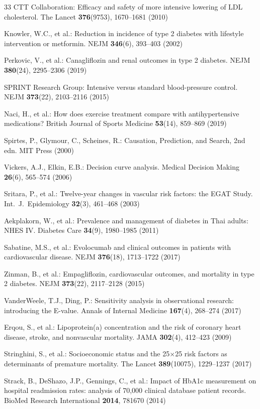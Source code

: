 \documentclass[runningheads]{llncs}
\begin{document}
\begin{thebibliography}{33}
CTT Collaboration:
Efficacy and safety of more intensive lowering of LDL cholesterol.
The Lancet \textbf{376}(9753), 1670--1681 (2010)

Knowler, W.C., et al.:
Reduction in incidence of type 2 diabetes with lifestyle intervention or metformin.
NEJM \textbf{346}(6), 393--403 (2002)

Perkovic, V., et al.:
Canagliflozin and renal outcomes in type 2 diabetes.
NEJM \textbf{380}(24), 2295--2306 (2019)

SPRINT Research Group:
Intensive versus standard blood-pressure control.
NEJM \textbf{373}(22), 2103--2116 (2015)

Naci, H., et al.:
How does exercise treatment compare with antihypertensive medications?
British Journal of Sports Medicine \textbf{53}(14), 859--869 (2019)

Spirtes, P., Glymour, C., Scheines, R.:
Causation, Prediction, and Search, 2nd edn.
MIT Press (2000)

Vickers, A.J., Elkin, E.B.:
Decision curve analysis.
Medical Decision Making \textbf{26}(6), 565--574 (2006)

Sritara, P., et al.:
Twelve-year changes in vascular risk factors: the EGAT Study.
Int.\ J.\ Epidemiology \textbf{32}(3), 461--468 (2003)

Aekplakorn, W., et al.:
Prevalence and management of diabetes in Thai adults: NHES IV.
Diabetes Care \textbf{34}(9), 1980--1985 (2011)

Sabatine, M.S., et al.:
Evolocumab and clinical outcomes in patients with cardiovascular disease.
NEJM \textbf{376}(18), 1713--1722 (2017)

Zinman, B., et al.:
Empagliflozin, cardiovascular outcomes, and mortality in type 2 diabetes.
NEJM \textbf{373}(22), 2117--2128 (2015)

VanderWeele, T.J., Ding, P.:
Sensitivity analysis in observational research: introducing the E-value.
Annals of Internal Medicine \textbf{167}(4), 268--274 (2017)

Erqou, S., et al.:
Lipoprotein(a) concentration and the risk of coronary heart disease,
stroke, and nonvascular mortality.
JAMA \textbf{302}(4), 412--423 (2009)

Stringhini, S., et al.:
Socioeconomic status and the 25$\times$25 risk factors as
determinants of premature mortality.
The Lancet \textbf{389}(10075), 1229--1237 (2017)

Strack, B., DeShazo, J.P., Gennings, C., et al.:
Impact of HbA1c measurement on hospital readmission rates:
analysis of 70,000 clinical database patient records.
BioMed Research International \textbf{2014}, 781670 (2014)

\end{thebibliography}
\end{document}
